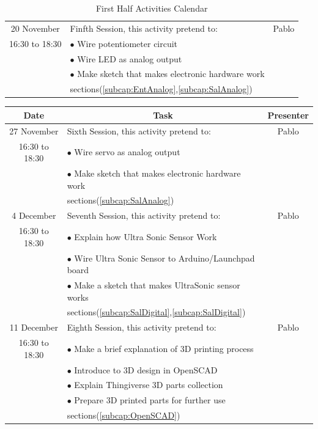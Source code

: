 \documentclass[]{article}
\begin{document}
\begin{table}[h!]
\begin{tabular}{|c|l|c|}
		20 November & Finfth Session, this activity pretend to: & Pablo \\ 
		16:30 to 18:30 & $\bullet$ Wire potentiometer circuit &     \\
		& $\bullet$ Wire LED as analog output  &     \\ 
		& $\bullet$ Make sketch that makes electronic hardware work & \\
		& sections(\ref{subcap:EntAnalog},\ref{subcap:SalAnalog}) & \\ \hline
		
	\end{tabular}
	\caption{First Half Activities Calendar}
	\label{cuadroCurso0}
\end{table}

\begin{table}[h!]
	\centering
	\begin{tabular}{|c|l|c|}
		\hline
		\textbf{Date} & \multicolumn{1}{c}{\textbf{Task}}     & \textbf{Presenter}      \\ \hline
		27 November & Sixth Session, this activity pretend to: & Pablo     \\ 
		16:30 to 18:30 & $\bullet$ Wire servo as analog output &     \\
		& $\bullet$ Make sketch that makes electronic hardware work &     \\ 
		& sections(\ref{subcap:SalAnalog})& \\ \hline
		4 December & Seventh Session, this activity pretend to: & Pablo \\
		16:30 to 18:30     & $\bullet$ Explain how Ultra Sonic Sensor Work &     \\
		& $\bullet$  Wire Ultra Sonic Sensor to Arduino/Launchpad board &     \\ 
		& $\bullet$  Make a sketch that makes UltraSonic sensor works & \\
		&sections(\ref{subcap:SalDigital},\ref{subcap:SalDigital})& \\ \hline
		11 December & Eighth Session, this activity pretend to: & Pablo \\
		16:30 to 18:30	 & $\bullet$ Make a brief explanation of 3D printing process & \\
		 & 	$\bullet$ Introduce to 3D design in OpenSCAD &     \\
		  & $\bullet$ Explain Thingiverse 3D parts collection &     \\
		& $\bullet$ Prepare 3D printed parts for further use &     \\  
		& sections(\ref{subcap:OpenSCAD})&\\ \hline
		

\end{tabular}
\end{table}
\end{document}
